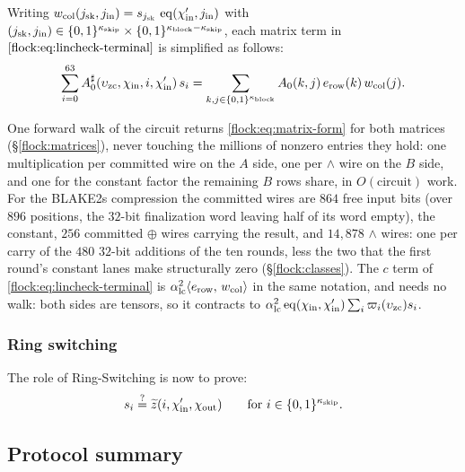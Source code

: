 Writing $w_{\mathrm{col}}(j_{\mathrm{sk}},j_{\mathrm{in}})=s_{j_{\mathrm{sk}}}\,\operatorname{eq}(\chi'_{\mathrm{in}},j_{\mathrm{in}})$ with $(j_{\mathrm{sk}},j_{\mathrm{in}}) \in\{0,1\}^{\kappa_{\mathrm{skip}}} \times \{0,1\}^{\kappa_{\mathrm{block}}-\kappa_{\mathrm{skip}}}$, each matrix term in $\eqref{flock:eq:lincheck-terminal}$ is simplified as follows:
\begin{equation}\label{flock:eq:matrix-form}
\sum_{i=0}^{63}A^{\sharp}_0(\upsilon_{\mathrm{zc}},\chi_{\mathrm{in}},i,\chi'_{\mathrm{in}})\,s_i=\sum_{k,j\in\{0,1\}^{\kappa_{\mathrm{block}}}}A_0(k,j)\,e_{\mathrm{row}}(k)\,w_{\mathrm{col}}(j).
\end{equation}

One forward walk of the circuit returns \eqref{flock:eq:matrix-form} for both matrices (\S\ref{flock:matrices}), never touching the millions of nonzero entries they hold: one multiplication per committed wire on the $A$ side, one per $\wedge$ wire on the $B$ side, and one for the constant factor the remaining $B$ rows share, in $O(\text{circuit})$ work. For the BLAKE2s compression the committed wires are $864$ free input bits (over $896$ positions, the $32$-bit finalization word leaving half of its word empty), the constant, $256$ committed $\oplus$ wires carrying the result, and $14{,}878$ $\wedge$ wires: one per carry of the $480$ $32$-bit additions of the ten rounds, less the two that the first round's constant lanes make structurally zero (\S\ref{flock:classes}). The $c$ term of \eqref{flock:eq:lincheck-terminal} is $\alpha_{\mathrm{lc}}^2\langle e_{\mathrm{row}},\, w_{\mathrm{col}} \rangle$ in the same notation, and needs no walk: both sides are tensors, so it contracts to $\alpha_{\mathrm{lc}}^2\operatorname{eq}(\chi_{\mathrm{in}},\chi'_{\mathrm{in}})\sum_i\varpi_i(\upsilon_{\mathrm{zc}})s_i$.

\subsubsection{Ring switching}\label{flock:ringswitch}

The role of Ring-Switching is now to prove:
\[
s_i \stackrel{?}{=} \widetilde{z}(i,\chi'_{\mathrm{in}},\chi_{\mathrm{out}})\qquad\text{for }i\in\{0,1\}^{\kappa_{\mathrm{skip}}}.
\]


\subsection{Protocol summary}\label{flock:summary}

